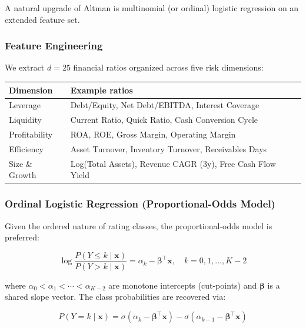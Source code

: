\documentclass[12pt, a4paper]{article}
\begin{document}
A natural upgrade of Altman is multinomial (or ordinal) logistic regression on an extended feature set.

\subsubsection{Feature Engineering}

We extract $d = 25$ financial ratios organized across five risk dimensions:

\begin{center}
\begin{tabularx}{\linewidth}{l X}
  \toprule
  \textbf{Dimension} & \textbf{Example ratios} \\
  \midrule
  Leverage      & Debt/Equity, Net Debt/EBITDA, Interest Coverage \\
  Liquidity     & Current Ratio, Quick Ratio, Cash Conversion Cycle \\
  Profitability & ROA, ROE, Gross Margin, Operating Margin \\
  Efficiency    & Asset Turnover, Inventory Turnover, Receivables Days \\
  Size \& Growth & Log(Total Assets), Revenue CAGR (3y), Free Cash Flow Yield \\
  \bottomrule
\end{tabularx}
\end{center}

\subsubsection{Ordinal Logistic Regression (Proportional-Odds Model)}

Given the ordered nature of rating classes, the proportional-odds model is preferred:

\begin{equation}
  \log \frac{P(Y \leq k \mid \mathbf{x})}{P(Y > k \mid \mathbf{x})} = \alpha_k - \boldsymbol{\beta}^\top \mathbf{x}, \quad k = 0,1,\ldots,K-2
\end{equation}

where $\alpha_0 < \alpha_1 < \cdots < \alpha_{K-2}$ are monotone intercepts (cut-points) and $\boldsymbol{\beta}$ is a shared slope vector.  The class probabilities are recovered via:

\begin{equation}
  P(Y = k \mid \mathbf{x}) = \sigma(\alpha_k - \boldsymbol{\beta}^\top \mathbf{x}) - \sigma(\alpha_{k-1} - \boldsymbol{\beta}^\top \mathbf{x})
\end{equation}
\end{document}
